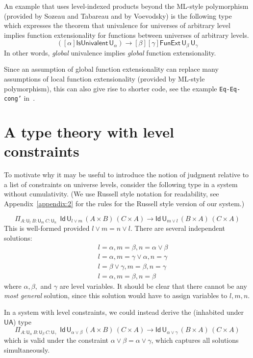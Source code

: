 \documentclass[a4paper,UKenglish,cleveref, autoref, thm-restate]{lipics-v2021}
\newcommand{\Id}{\mathsf{Id}}
\newcommand{\UU}{\mathsf{U}}
\newcommand{\UA}{\mathsf{UA}}
\begin{document}
An example that uses level-indexed products beyond the ML-style
polymorphism (provided by Sozeau and Tabareau and by Voevodsky)
is the following type which
expresses the theorem that univalence for universes of arbitrary level implies
function extensionality for functions between universes of arbitrary levels.
$$
([\alpha]\mathsf{IsUnivalent}\, \UU_\alpha)
\to [\beta][\gamma] \mathsf{FunExt}\, \UU_\beta\, \UU_\gamma
$$
In other words, {\em global} univalence implies {\em global} function
extensionality.

Since an assumption of global function extensionality can replace many assumptions of local function extensionality (provided by ML-style polymorphism), this can also give rise to shorter code, see the example {\tt Eq-Eq-cong'} in~\cite{hott:uf:in:agda}.


\section{A type theory with level constraints}\label{sec:constraints}

To motivate why it may be useful to introduce the notion of judgment relative to a list of constraints on universe levels, consider the following type in a system without cumulativity. (We use Russell style notation for readability, see Appendix~\ref{appendix:2} for the rules for the Russell style version of our system.)

$$
    \Pi_{A:\UU_l~{B}:{\UU_m}~{C}:{\UU_n}}
    {~~\Id\,\UU_{l \vee m}\, (A\times B)\,(C \times A)
    \to \Id\,\UU_{m \vee l} \, (B\times A)\,(C \times A)}
$$
This is well-formed provided $l \vee m = n \vee l$.
There are several independent solutions:
\begin{eqnarray*}
&&l = \alpha, m = \beta, n = \alpha \vee \beta\\
&&l = \alpha, m = \gamma \vee \alpha, n = \gamma\\
&&l = \beta \vee \gamma, m = \beta, n = \gamma\\
&&l = \alpha, m = \beta, n = \beta
\end{eqnarray*}
where $\alpha, \beta,$ and $\gamma$ are level
variables. It should be clear that there cannot be any {\em most general} solution, since this solution would have to
assign variables to $l,m,n$.


In a system with level constraints,
we could instead derive the (inhabited under $\UA$) type
$$
    \Pi_{A:\UU_\alpha~{B}:{\UU_\beta}~{C}:{\UU_\gamma}}
    {~~\Id\,\UU_{\alpha \vee \beta}\, (A\times B)\,(C \times A)
    \to \Id\,\UU_{\alpha \vee \gamma}\, (B\times A)\,(C \times A)}
$$
which is valid under the constraint
$\alpha \vee \beta = \alpha \vee \gamma$,
which captures all solutions simultaneously.
\end{document}
